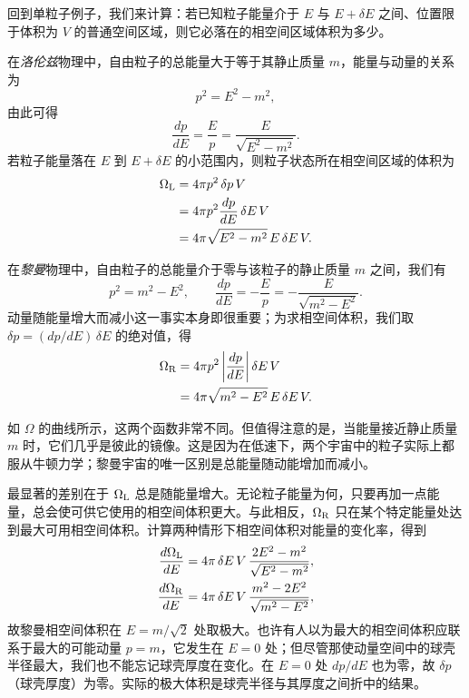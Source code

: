 
回到单粒子例子，我们来计算：若已知粒子能量介于 $E$ 与 $E+\delta E$ 之间、位置限于体积为 $V$ 的普通空间区域，则它必落在的相空间区域体积为多少。

在\emph{洛伦兹}物理中，自由粒子的总能量大于等于其静止质量 $m$，能量与动量的关系为
\begin{equation}
p^{2}=E^{2}-m^{2},
\end{equation}
由此可得
\begin{equation}
\frac{dp}{dE}=\frac{E}{p}=\frac{E}{\sqrt{E^{2}-m^{2}}}.
\end{equation}
若粒子能量落在 $E$ 到 $E+\delta E$ 的小范围内，则粒子状态所在相空间区域的体积为
\begin{align}
\Omega_{\mathrm{L}}
&= 4\pi p^{2}\,\delta p\,V \nonumber\\
&= 4\pi p^{2}\frac{dp}{dE}\,\delta E\,V \nonumber\\
&= 4\pi\sqrt{E^{2}-m^{2}}\,E\,\delta E\,V .
\end{align}

在\emph{黎曼}物理中，自由粒子的总能量介于零与该粒子的静止质量 $m$ 之间，我们有
\begin{equation}
p^{2}=m^{2}-E^{2},\qquad
\frac{dp}{dE}=-\frac{E}{p}=-\frac{E}{\sqrt{m^{2}-E^{2}}}.
\end{equation}
动量随能量增大而减小这一事实本身即很重要；为求相空间体积，我们取 $\delta p=(dp/dE)\,\delta E$ 的绝对值，得
\begin{align}
\Omega_{\mathrm{R}}
&= 4\pi p^{2}\left|\frac{dp}{dE}\right|\delta E\,V \nonumber\\
&= 4\pi\sqrt{m^{2}-E^{2}}\,E\,\delta E\,V .
\end{align}

如 $\Omega$ 的曲线所示，这两个函数非常不同。但值得注意的是，当能量接近静止质量 $m$ 时，它们几乎是彼此的镜像。这是因为在低速下，两个宇宙中的粒子实际上都服从牛顿力学；黎曼宇宙的唯一区别是总能量随动能增加而减小。

最显著的差别在于 $\Omega_{\mathrm{L}}$ 总是随能量增大。无论粒子能量为何，只要再加一点能量，总会使可供它使用的相空间体积更大。与此相反，$\Omega_{\mathrm{R}}$ 只在某个特定能量处达到最大可用相空间体积。计算两种情形下相空间体积对能量的变化率，得到
\begin{align}
\frac{d\Omega_{\mathrm{L}}}{dE}&=4\pi\,\delta E\,V\,\frac{2E^{2}-m^{2}}{\sqrt{E^{2}-m^{2}}},\\
\frac{d\Omega_{\mathrm{R}}}{dE}&=4\pi\,\delta E\,V\,\frac{m^{2}-2E^{2}}{\sqrt{m^{2}-E^{2}}},
\end{align}
故黎曼相空间体积在 $E=m/\sqrt2$ 处取极大。也许有人以为最大的相空间体积应联系于最大的可能动量 $p=m$，它发生在 $E=0$ 处；但尽管那使动量空间中的球壳半径最大，我们也不能忘记球壳厚度在变化。在 $E=0$ 处 $dp/dE$ 也为零，故 $\delta p$（球壳厚度）为零。实际的极大体积是球壳半径与其厚度之间折中的结果。


